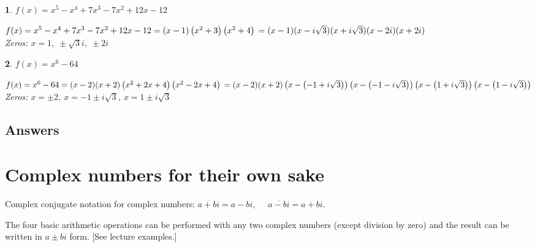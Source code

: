 \documentclass{amsbook}
\newtheorem{exc}{}
\newenvironment{ex}{\begin{exc}\normalfont}{\end{exc}}
\numberwithin{section}{chapter}
\numberwithin{equation}{chapter}
\begin{document}
\begin{multicols}{2}
\begin{ex}
	 $f(x) = x^5 - x^4+7x^3-7x^2+12x-12 $
	\begin{sol}
		  $f(x) = x^5 - x^4+7x^3-7x^2+12x-12 = (x-1) \left(x^2 + 3\right) \left(x^2 + 4 \right) \\
		 = (x-1)(x - i \sqrt{3})(x + i \sqrt{3})(x-2i)(x+2i)$ \\
		Zeros:  $x = 1, \;  \pm  \sqrt{3}i,  \; \pm 2i$
	\end{sol}
\end{ex}

\begin{ex}
	 $f(x) = x^6 - 64 $
	\begin{sol}
		 $f(x) = x^6 - 64 = (x-2)(x+2)\left(x^2+2x+4\right)\left(x^2-2x+4\right) \\
		= (x-2)(x+2)\left( x - \left( -1+i\sqrt{3} \right) \right)\left( x - \left( -1-i\sqrt{3} \right) \right)\left( x - \left( 1+i\sqrt{3} \right) \right)\left( x - \left( 1-i\sqrt{3} \right) \right)$ \\
		Zeros:  $x = \pm 2$, $x = -1 \pm i\sqrt{3}$, $x = 1 \pm i\sqrt{3}$
	\end{sol}
\end{ex}

\end{multicols}

\subsection*{Answers \nopunct} \hfill
	



\newpage
\section{Complex numbers for their own sake}

Complex conjugate notation for complex numbers:  $\overline{a+bi} = a-bi$,\ \ \  $\overline{a-bi} = a+bi$.

The four basic arithmetic operations can be performed with any two complex numbers (except division by zero) and the result can be written in $a\pm bi$ form. [See lecture examples.]

\begin{comment}

\begin{itemize}
	\item Addition and subtraction are straightforward. Remember to treat both real and complex parts as a single number at the beginning (parentheses help), then expand, then simply collect real and imaginary parts.
	\item Perform multiplication by expanding as usual (FOIL), replacing $i^2$ with $-1$, then collecting parts again.
	\item The trick for division is ``rationalizing'' using the complex conjugate (just as with radicals since $i=\sqrt{-1}$).
\end{itemize}
\end{comment}
\end{document}
